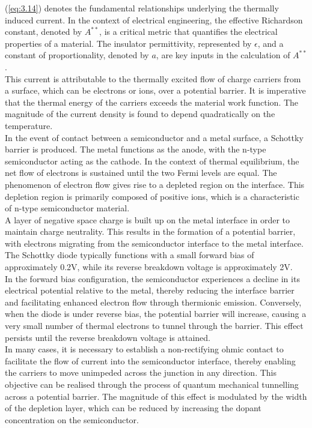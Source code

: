 \noindent (\ref{eq:3.14}) denotes the fundamental relationships underlying the thermally induced current. In the context of electrical engineering, the effective Richardson constant, denoted by $A^{**}$, is a critical metric that quantifies the electrical properties of a material. The insulator permittivity, represented by $\epsilon$, and a constant of proportionality, denoted by $a$, are key inputs in the calculation of $A^{**}$. \\

\noindent This current is attributable to the thermally excited flow of charge carriers from a surface, which can be electrons or ions, over a potential barrier. It is imperative that the thermal energy of the carriers exceeds the material work function. The magnitude of the current density is found to depend quadratically on the temperature.\\

\noindent In the event of contact between a semiconductor and a metal surface, a Schottky barrier is produced. The metal functions as the anode, with the n-type semiconductor acting as the cathode. In the context of thermal equilibrium, the net flow of electrons is sustained until the two Fermi levels are equal. The phenomenon of electron flow gives rise to a depleted region on the interface. This depletion region is primarily composed of positive ions, which is a characteristic of n-type semiconductor material.\\

\noindent A layer of negative space charge is built up on the metal interface in order to maintain charge neutrality. This results in the formation of a potential barrier, with electrons migrating from the semiconductor interface to the metal interface. The Schottky diode typically functions with a small forward bias of approximately 0.2V, while its reverse breakdown voltage is approximately 2V.\\

\noindent In the forward bias configuration, the semiconductor experiences a decline in its electrical potential relative to the metal, thereby reducing the interface barrier and facilitating enhanced electron flow through thermionic emission. Conversely, when the diode is under reverse bias, the potential barrier will increase, causing a very small number of thermal electrons to tunnel through the barrier. This effect persists until the reverse breakdown voltage is attained.\\

\noindent In many cases, it is necessary to establish a non-rectifying ohmic contact to facilitate the flow of current into the semiconductor interface, thereby enabling the carriers to move unimpeded across the junction in any direction. This objective can be realised through the process of quantum mechanical tunnelling across a potential barrier. The magnitude of this effect is modulated by the width of the depletion layer, which can be reduced by increasing the dopant concentration on the semiconductor. \\

